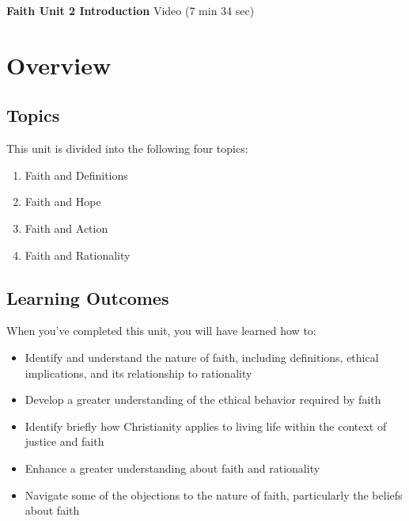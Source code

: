 \documentclass[
]{book}
\providecommand{\tightlist}{%
  \setlength{\itemsep}{0pt}\setlength{\parskip}{0pt}}
\begin{document}
\textbf{Faith Unit 2 Introduction} Video (7 min 34 sec)

\hypertarget{overview-1}{%
\section*{Overview}\label{overview-1}}

\hypertarget{topics-1}{%
\subsection*{Topics}\label{topics-1}}

This unit is divided into the following four topics:

\begin{enumerate}
\def\labelenumi{\arabic{enumi}.}
\tightlist
\item
  Faith and Definitions\\
\item
  Faith and Hope\\
\item
  Faith and Action\\
\item
  Faith and Rationality
\end{enumerate}

\hypertarget{learning-outcomes-1}{%
\subsection*{Learning Outcomes}\label{learning-outcomes-1}}

When you've completed this unit, you will have learned how to:

\begin{itemize}
\tightlist
\item
  Identify and understand the nature of faith, including definitions, ethical implications, and its relationship to rationality
\item
  Develop a greater understanding of the ethical behavior required by faith
\item
  Identify briefly how Christianity applies to living life within the context of justice and faith
\item
  Enhance a greater understanding about faith and rationality
\item
  Navigate some of the objections to the nature of faith, particularly the beliefs about faith
\end{itemize}
\end{document}
